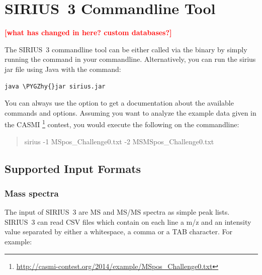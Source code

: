 \documentclass[letterpaper,10pt,openany,oneside]{sphinxmanual}
\newcommand{\todo}[1]{\xspace{\bfseries\sffamily\textcolor{red}{[#1]}}\xspace}
\def\PYGZhy{\char`\-}
\begin{document}

\chapter{SIRIUS~3 Commandline Tool}
\label{commandline::doc}\label{commandline:sirius-commandline-tool}

\todo{what has changed in here? custom databases?}

The SIRIUS~3 commandline tool can be either called via the binary by simply running the command  in your commandline. Alternatively, you can run the sirius jar file using Java with the command:

\begin{Verbatim}[commandchars=\\\{\}]
java \PYGZhy{}jar sirius.jar
\end{Verbatim}

You can always use the  option to get a documentation about the available commands and options. Assuming you want to analyze the example data given in the CASMI \footnote{\sphinxAtStartFootnote%
\url{http://casmi-contest.org/2014/example/MSpos\_Challenge0.txt}
} contest, you would execute the following on the commandline:
\begin{quote}

sirius -1 MSpos\_Challenge0.txt -2 MSMSpos\_Challenge0.txt
\end{quote}



\section{Supported Input Formats}
\label{commandline:inputformats}\label{commandline:supported-input-formats}

\subsection{Mass spectra}
\label{commandline:mass-spectra}
The input of SIRIUS~3 are MS and MS/MS spectra as simple peak lists. SIRIUS~3 can read CSV files which contain on each line a m/z and an intensity value separated by either a whitespace, a comma or a TAB character. For example:
\end{document}
